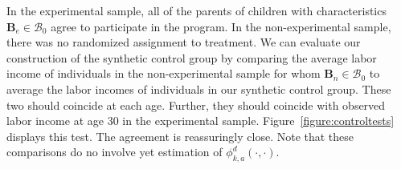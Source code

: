 \noindent In the experimental sample, all of the parents of children with characteristics $\bm{B}_{e} \in \mathcal{B}_0$ agree to participate in the program. In the non-experimental sample, there was no randomized assignment to treatment. We can evaluate our construction of the synthetic control group by comparing the average labor income of individuals in the non-experimental sample for whom $\bm{B}_{n} \in \mathcal{B}_0$ to average the labor incomes of individuals in our synthetic control group. These two should coincide at each age. Further, they should coincide with observed labor income at age 30 in the experimental sample. Figure~\ref{figure:controltests} displays this test. The agreement is reassuringly close. Note that these comparisons do no involve yet estimation of  $\phi^d_{k,a}\left( \cdot, \cdot \right)$.

